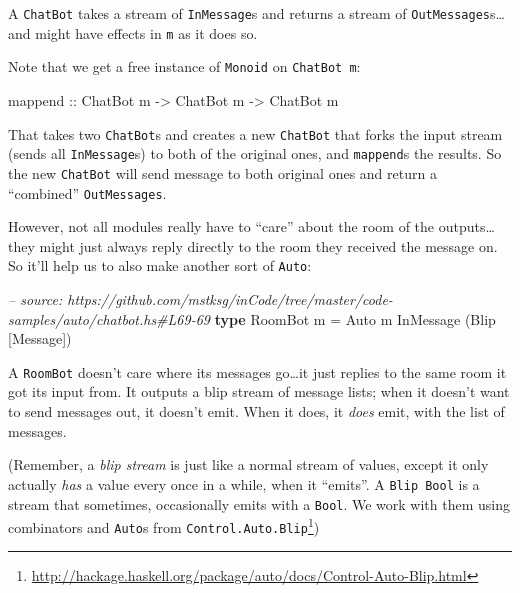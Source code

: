 \documentclass[]{article}
\newenvironment{Shaded}{}{}
\newcommand{\KeywordTok}[1]{\textcolor[rgb]{0.00,0.44,0.13}{\textbf{{#1}}}}
\newcommand{\DataTypeTok}[1]{\textcolor[rgb]{0.56,0.13,0.00}{{#1}}}
\newcommand{\CommentTok}[1]{\textcolor[rgb]{0.38,0.63,0.69}{\textit{{#1}}}}
\newcommand{\OtherTok}[1]{\textcolor[rgb]{0.00,0.44,0.13}{{#1}}}
\newcommand{\FunctionTok}[1]{\textcolor[rgb]{0.02,0.16,0.49}{{#1}}}
\newcommand{\NormalTok}[1]{{#1}}
\renewcommand{\href}[2]{#2\footnote{\url{#1}}}
\begin{document}
A \texttt{ChatBot} takes a stream of \texttt{InMessage}s and returns a stream of
\texttt{OutMessages}s\ldots{}and might have effects in \texttt{m} as it does so.

Note that we get a free instance of \texttt{Monoid} on \texttt{ChatBot\ m}:

\begin{Shaded}
\begin{Highlighting}[]
\NormalTok{mappend}\OtherTok{ ::} \DataTypeTok{ChatBot} \NormalTok{m }\OtherTok{->} \DataTypeTok{ChatBot} \NormalTok{m }\OtherTok{->} \DataTypeTok{ChatBot} \NormalTok{m}
\end{Highlighting}
\end{Shaded}

That takes two \texttt{ChatBot}s and creates a new \texttt{ChatBot} that forks
the input stream (sends all \texttt{InMessage}s) to both of the original ones,
and \texttt{mappend}s the results. So the new \texttt{ChatBot} will send message
to both original ones and return a ``combined'' \texttt{OutMessages}.

However, not all modules really have to ``care'' about the room of the
outputs\ldots{}they might just always reply directly to the room they received
the message on. So it'll help us to also make another sort of \texttt{Auto}:

\begin{Shaded}
\begin{Highlighting}[]
\CommentTok{-- source: https://github.com/mstksg/inCode/tree/master/code-samples/auto/chatbot.hs#L69-69}
\KeywordTok{type} \DataTypeTok{RoomBot} \NormalTok{m }\FunctionTok{=} \DataTypeTok{Auto} \NormalTok{m }\DataTypeTok{InMessage} \NormalTok{(}\DataTypeTok{Blip} \NormalTok{[}\DataTypeTok{Message}\NormalTok{])}
\end{Highlighting}
\end{Shaded}

A \texttt{RoomBot} doesn't care where its messages go\ldots{}it just replies to
the same room it got its input from. It outputs a blip stream of message lists;
when it doesn't want to send messages out, it doesn't emit. When it does, it
\emph{does} emit, with the list of messages.

(Remember, a \emph{blip stream} is just like a normal stream of values, except
it only actually \emph{has} a value every once in a while, when it ``emits''. A
\texttt{Blip\ Bool} is a stream that sometimes, occasionally emits with a
\texttt{Bool}. We work with them using combinators and \texttt{Auto}s from
\href{http://hackage.haskell.org/package/auto/docs/Control-Auto-Blip.html}{\texttt{Control.Auto.Blip}})
\end{document}
